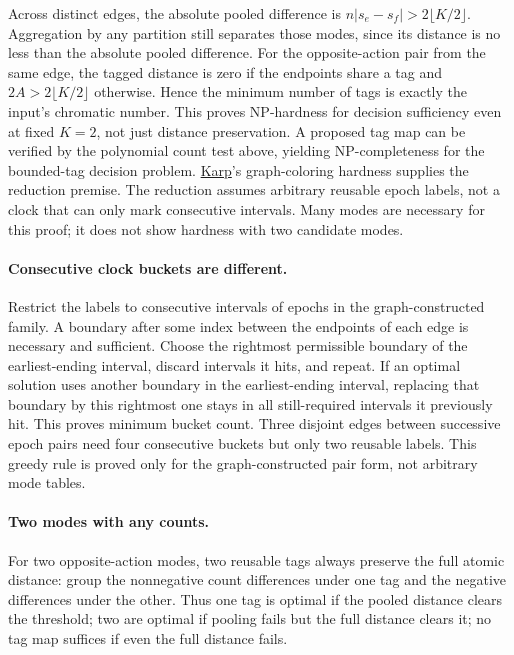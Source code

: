 \documentclass{article}
\begin{document}
Across distinct edges, the absolute pooled difference is
$n|s_e-s_f|>2\lfloor K/2\rfloor$. Aggregation by any partition
still separates those modes, since its distance is no less than
the absolute pooled difference. For the opposite-action pair
from the same edge, the tagged distance is zero if the endpoints
share a tag and $2A>2\lfloor K/2\rfloor$ otherwise. Hence the
minimum number of tags is exactly the input's chromatic number.
This proves NP-hardness for decision sufficiency even at fixed
$K=2$, not just distance preservation. A proposed tag map can be
verified by the polynomial count test above, yielding NP-completeness
for the bounded-tag decision problem.
\href{https://www.cs.umd.edu/~gasarch/BLOGPAPERS/Karp.pdf}{Karp}'s
graph-coloring hardness supplies the reduction premise. The reduction
assumes arbitrary reusable epoch labels, not a clock that can only
mark consecutive intervals. Many modes are necessary for this proof;
it does not show hardness with two candidate modes.

\paragraph{Consecutive clock buckets are different.}
Restrict the labels to consecutive intervals of epochs in the
graph-constructed family. A boundary after some index between the
endpoints of each edge is necessary and sufficient. Choose the
rightmost permissible boundary of the earliest-ending interval,
discard intervals it hits, and repeat. If an optimal solution uses
another boundary in the earliest-ending interval, replacing that
boundary by this rightmost one stays in all still-required intervals
it previously hit. This proves minimum bucket count. Three disjoint
edges between successive epoch pairs need four consecutive buckets
but only two reusable labels. This greedy rule is proved only for
the graph-constructed pair form, not arbitrary mode tables.

\paragraph{Two modes with any counts.}
For two opposite-action modes, two reusable tags always preserve
the full atomic distance: group the nonnegative count differences
under one tag and the negative differences under the other. Thus
one tag is optimal if the pooled distance clears the threshold; two
are optimal if pooling fails but the full distance clears it; no
tag map suffices if even the full distance fails.
\end{document}
